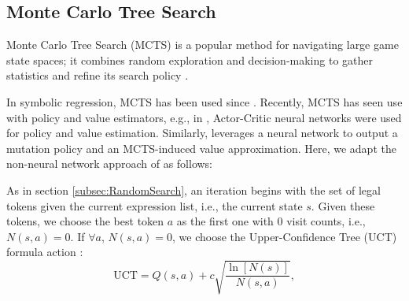 \documentclass[runningheads]{llncs}
\begin{document}




\subsection{Monte Carlo Tree Search}\label{subsec:MonteCarlo TreeSearch}

Monte Carlo Tree Search (MCTS) is a popular method for navigating large game state spaces; it combines random exploration and decision-making to gather statistics and refine its search policy \cite{Silver2016} \cite{Swiechowski2023}.

In symbolic regression, MCTS has been used since \cite{CazenaveMCTS}. Recently, MCTS has seen use with policy and value estimators, e.g., in \cite{Lu2021}, Actor-Critic neural networks were used for policy and value estimation. Similarly, \cite{10.5555/3618408.3619047} leverages a neural network to output a mutation policy and an MCTS-induced value approximation. Here, we adapt the non-neural network approach of \cite{sun2023symbolic} as follows:
\par As in section \ref{subsec:RandomSearch}, an iteration begins with the set of legal tokens given the current expression list, i.e., the current state $s$. Given these tokens, we choose the best token $a$ as the first one with 0 visit counts, i.e., $N(s,a) = 0$.  If $\forall a$, $N(s,a) = 0$, we choose the Upper-Confidence Tree (UCT) formula action \cite{sun2023symbolic}:
\begin{equation}
\mathrm{UCT} = Q(s,a) + c\sqrt{\frac{\ln{[N(s)]}}{N(s,a)}}, \label{eq:UCT_formula}
\end{equation}
\end{document}
